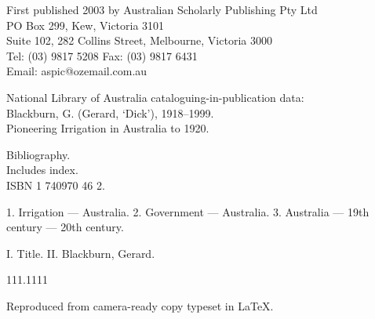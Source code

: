 \documentclass[11pt,b5paper,titlepage]{book}
\newcommand{\clearemptydoublepage}{\newpage{\pagestyle{empty}\cleardoublepage}}
\renewcommand{\headrulewidth}{0pt}%
\begin{document}
\begin{titlepage}
\begin{raggedright}
\medskip
First published 2003 by Australian Scholarly Publishing Pty Ltd\\
PO Box 299, Kew, Victoria 3101\\
Suite 102, 282 Collins Street, Melbourne, Victoria 3000\\
Tel: (03) 9817 5208 \quad Fax: (03) 9817 6431\\
Email: aspic@ozemail.com.au


\bigskip
National Library of Australia cataloguing-in-publication data:\\

\medskip
Blackburn, G. (Gerard, `Dick'), 1918--1999.\\
Pioneering Irrigation in Australia to 1920.\\
\begin{list}{}{\setlength{\topsep}{0ex}\setlength{\itemsep}{0ex}\setlength{\leftmargin}{2.5ex}}
\item
Bibliography.\\
Includes index.\\
ISBN 1 740970 46 2.

\item
1. Irrigation --- Australia. 2. Government --- Australia. 3. Australia
   --- 19th century --- 20th century.

\item
I. Title. II. Blackburn, Gerard.

\end{list}
111.1111

\medskip
Reproduced from camera-ready copy typeset in \LaTeX.

\end{raggedright}
\clearemptydoublepage

\end{titlepage}


\pagestyle{plain}
\tableofcontents
\clearemptydoublepage

\clearemptydoublepage

\clearemptydoublepage

\mainmatter
\pagestyle{fancy}
\renewcommand{\headrulewidth}{0.4pt}
\fancyhead[LE,RO]{\sffamily \small \thepage}
\fancyfoot{}
\end{document}
